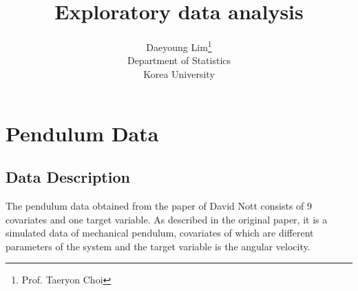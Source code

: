 \documentclass[11pt]{article}
\begin{document}
\nocite{*}

\title{Exploratory data analysis}

\author{Daeyoung Lim\thanks{Prof. Taeryon Choi} \\
Department of Statistics \\
Korea University}

\maketitle
\section{Pendulum Data}
\subsection{Data Description}
The pendulum data obtained from the paper of David Nott consists of 9 covariates and one target variable. As described in the original paper, it is a simulated data of mechanical pendulum, covariates of which are different parameters of the system and the target variable is the angular velocity.
\end{document}
